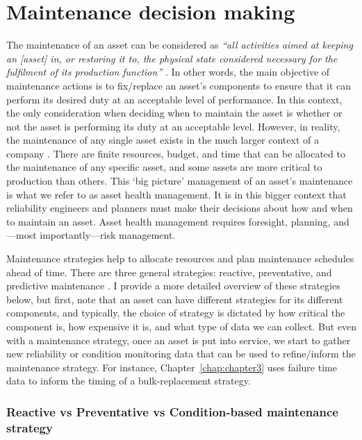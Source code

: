 \section{Maintenance decision making}
\label{sec:decisions}

The maintenance of an asset can be considered as \textit{``all activities aimed at keeping an [asset] in, or restoring it to, the physical state considered necessary for the fulfilment of its production function''} \citep{geraerds1985}. In other words, the main objective of maintenance actions is to fix/replace an asset's components to ensure that it can perform its desired duty at an acceptable level of performance. In this context, the only consideration when deciding when to maintain the asset is whether or not the asset is performing its duty at an acceptable level. However, in reality, the maintenance of any single asset exists in the much larger context of a company \citep{jardine2013}. There are finite resources, budget, and time that can be allocated to the maintenance of any specific asset, and some assets are more critical to production than others. This `big picture' management of an asset's maintenance is what we refer to as asset health management. It is in this bigger context that reliability engineers and planners must make their decisions about how and when to maintain an asset. Asset health management requires foresight, planning, and---most importantly---risk management.

Maintenance strategies help to allocate resources and plan maintenance schedules ahead of time. There are three general strategies: reactive, preventative, and predictive maintenance \citep{jardine2013}. I provide a more detailed overview of these strategies below, but first, note that an asset can have different strategies for its different components, and typically, the choice of strategy is dictated by how critical the component is, how expensive it is, and what type of data we can collect. But even with a maintenance strategy, once an asset is put into service, we start to gather new reliability or condition monitoring data that can be used to refine/inform the maintenance strategy. For instance, Chapter~\ref{chap:chapter3} uses failure time data to inform the timing of a bulk-replacement strategy.

\subsubsection*{Reactive vs Preventative vs Condition-based maintenance strategy}

